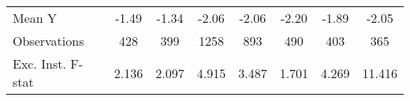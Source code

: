 {\begin{tabular}{l*{7}{c}}
\midrule
Mean Y      &       -1.49         &       -1.34         &       -2.06         &       -2.06         &       -2.20         &       -1.89         &       -2.05         \\
Observations&         428         &         399         &        1258         &         893         &         490         &         403         &         365         \\
Exc. Inst. F-stat&       2.136         &       2.097         &       4.915         &       3.487         &       1.701         &       4.269         &      11.416         \\
\bottomrule
\end{tabular}
}
